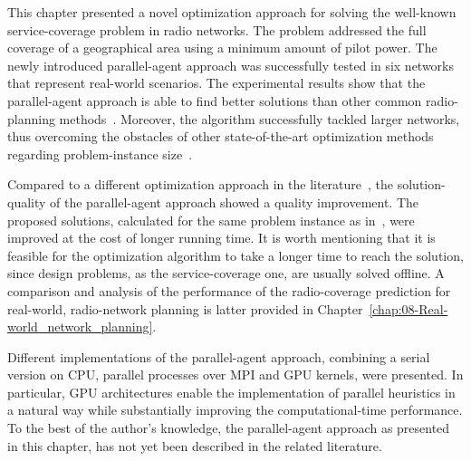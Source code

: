 This chapter presented a novel optimization approach for solving the
well-known service-coverage problem in radio networks. The problem
addressed the full coverage of a geographical area using a minimum
amount of pilot power. The newly introduced parallel-agent approach
was successfully tested in six networks that represent real-world
scenarios. The experimental results show that the parallel-agent approach
is able to find better solutions than other common radio-planning
methods~\cite{Holma_WCDMA.for.UMTS:2005}. Moreover, the algorithm
successfully tackled larger networks, thus overcoming the obstacles
of other state-of-the-art optimization methods regarding problem-instance
size~\cite{Siomina_Pilot.power.optimization:2004,Siomina:Minimum.pilot.power.for.service.coverage}.

Compared to a different optimization approach in the literature~\cite{Siomina-Minimum_pilot_power_for_service_coverage:2007},
the solution-quality of the parallel-agent approach showed a quality
improvement. The proposed solutions, calculated for the same problem
instance as in~\cite{Siomina:Minimum.pilot.power.for.service.coverage},
were improved at the cost of longer running time. It is worth mentioning
that it is feasible for the optimization algorithm to take a longer
time to reach the solution, since design problems, as the service-coverage
one, are usually solved offline. A comparison and analysis of the
performance of the radio-coverage prediction for real-world, radio-network
planning is latter provided in Chapter~\ref{chap:08-Real-world_network_planning}.

Different implementations of the parallel-agent approach, combining
a serial version on CPU, parallel processes over MPI and GPU kernels,
were presented. In particular, GPU architectures enable the implementation
of parallel heuristics in a natural way while substantially improving
the computational-time performance. To the best of the author's knowledge,
the parallel-agent approach as presented in this chapter, has not
yet been described in the related literature.
